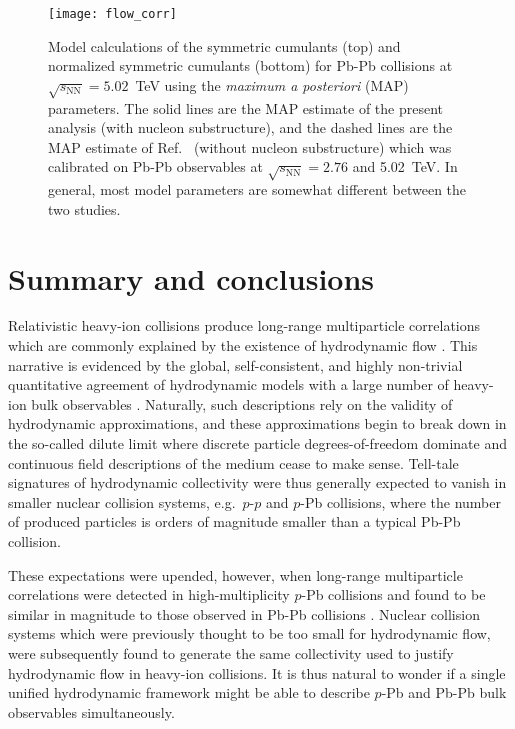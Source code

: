 \documentclass[aps,prc,reprint,amsmath,nofootinbib]{revtex4-1}
\newcommand{\sqrts}{\sqrt{s_\mathrm{NN}}}
\begin{document}
\begin{figure}
  \texttt{[image: flow\_corr]}
  \caption{
    \label{fig:flow_corr}
    Model calculations of the symmetric cumulants (top) and normalized symmetric cumulants (bottom) for Pb-Pb collisions at $\sqrts=5.02$~TeV using the \emph{maximum a posteriori} (MAP) parameters.
    The solid lines are the MAP estimate of the present analysis (with nucleon substructure), and the dashed lines are the MAP estimate of Ref.~\cite{Bernhard:2018hnz} (without nucleon substructure) which was calibrated on Pb-Pb observables at $\sqrts=2.76$ and 5.02~TeV.
    In general, most model parameters are somewhat different between the two studies.
  }
\end{figure}

\section{Summary and conclusions}
\label{sec:summary}

Relativistic heavy-ion collisions produce long-range multiparticle correlations which are commonly explained by the existence of hydrodynamic flow \cite{deSouza:2015ena}.
This narrative is evidenced by the global, self-consistent, and highly non-trivial quantitative agreement of hydrodynamic models with a large number of heavy-ion bulk observables \cite{Niemi:2015qia, Bernhard:2016tnd, Gale:2012rq}.
Naturally, such descriptions rely on the validity of hydrodynamic approximations, and these approximations begin to break down in the so-called dilute limit where discrete particle degrees-of-freedom dominate and continuous field descriptions of the medium cease to make sense.
Tell-tale signatures of hydrodynamic collectivity were thus generally expected to vanish in smaller nuclear collision systems, e.g.\ $p$-$p$ and $p$-Pb collisions, where the number of produced particles is orders of magnitude smaller than a typical Pb-Pb collision.

These expectations were upended, however, when long-range multiparticle correlations were detected in high-multiplicity $p$-Pb collisions and found to be similar in magnitude to those observed in Pb-Pb collisions \cite{CMS:2012qk, Abelev:2012ola, Aad:2012gla}.
Nuclear collision systems which were previously thought to be too small for hydrodynamic flow, were subsequently found to generate the same collectivity used to justify hydrodynamic flow in heavy-ion collisions.
It is thus natural to wonder if a single unified hydrodynamic framework might be able to describe $p$-Pb and Pb-Pb bulk observables simultaneously.
\end{document}
